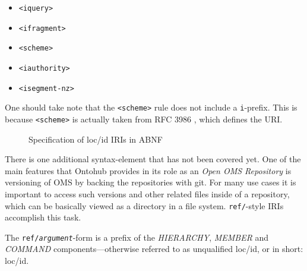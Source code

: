 \documentclass[10pt, a4paper]{isov2}
\begin{document}
 \begin{itemize} 
  \item \texttt{<iquery>}
  \item \texttt{<ifragment>}
  \item \texttt{<scheme>}
  \item \texttt{<iauthority>}
  \item \texttt{<isegment-nz>}
 \end{itemize} 

One should take note that the \texttt{<scheme>} rule does not include a
\texttt{i}-prefix.  This is because \texttt{<scheme>} is actually taken from
RFC 3986 \cite{rfc3986}, which defines the URI.

\begin{figure}[b]
  \centering
  
  \caption[loc/id specification in ABNF]
   {Specification of loc/id IRIs in ABNF}
  \label{lst:loc-id-spec}
\end{figure}

\clearpage




There is one additional syntax-element that has not been covered yet. One of the
main features that Ontohub provides in its role as an \emph{Open OMS Repository}
is versioning of OMS by backing the repositories with git. For many use cases it is 
important to access such versions and other related files inside of a
repository, which can be basically viewed as a directory in a file system.
\texttt{ref/}-style IRIs accomplish this task.

The \texttt{ref/\emph{argument}}-form is a prefix of the \emph{HIERARCHY},
\emph{MEMBER} and \emph{COMMAND} components---otherwise referred to as
unqualified loc/id, or in short: loc/id.
\end{document}
